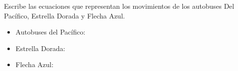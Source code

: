 Escribe las ecuaciones que representan los movimientos de los autobuses Del Pacífico, Estrella Dorada y Flecha Azul.

\begin{itemize}
    \item Autobuses del Pac\'ifico: \fillin[$y = 0.6875x + 20$]
    \item Estrella Dorada: \fillin[$y = 0.5x + 20$]
    \item Flecha Azul: \fillin[$y = 0.5x$]
\end{itemize}
